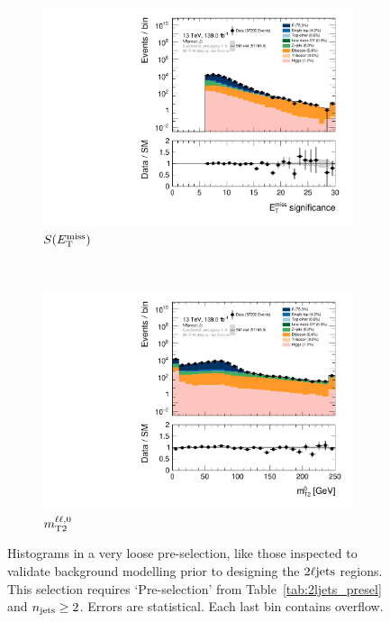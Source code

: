 \begin{figure}[tp]
\centering
\begin{subfigure}{0.62\textwidth}
\centering
\includegraphics[width=\textwidth]{figures/2ljets_prepre_met_Sign_VRpresel_2j_MCfakeslogY.pdf}
\caption{$S(E_\mathrm{T}^\mathrm{miss})$}
\end{subfigure}
\\
\begin{subfigure}{0.62\textwidth}
\centering
\includegraphics[width=\textwidth]{figures/2ljets_prepre_mt2leplsp_0_VRpresel_2j_MCfakeslogY.pdf}
\caption{$m_\mathrm{T2}^{\ell\ell,0}$}
\end{subfigure}
\caption[
Histograms in a very loose pre-selection
]{%
Histograms in a very loose pre-selection, like those inspected to validate
background modelling prior to designing the $2\ell\mathrm{jets}$ regions.
This selection requires `Pre-selection' from Table~\ref{tab:2ljets_presel} and
$n_\mathrm{jets} \geq 2$.
Errors are statistical.
Each last bin contains overflow.
}
\label{fig:2ljets_prepre}
\end{figure}


